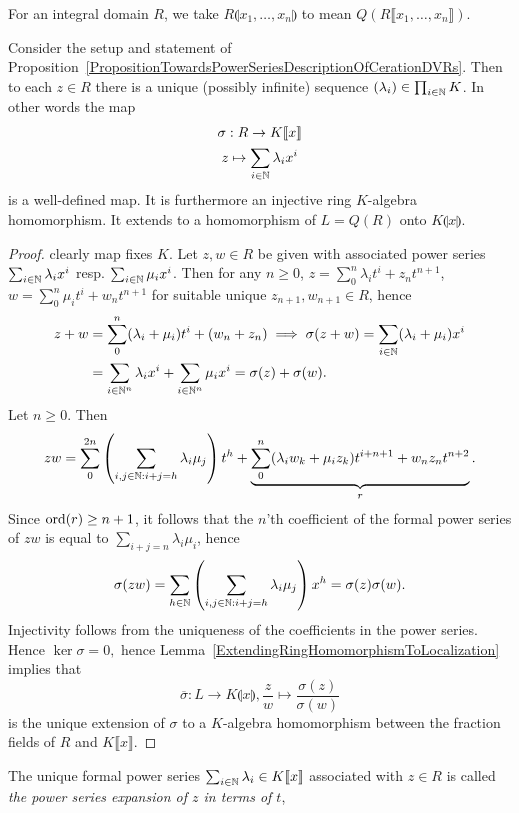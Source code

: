 \begin{definition}
    For an integral domain $R$, we take $R\llparenthesis x_1,\dots,x_n\rrparenthesis$ to mean $Q(R\llbracket x_1,\dots,x_n\rrbracket)$. 
\end{definition}
\begin{proposition}
    Consider the setup and statement of Proposition~\ref{PropositionTowardsPowerSeriesDescriptionOfCerationDVRs}. Then to each $z\in R$ there is a unique (possibly infinite) sequence $(\lambda_i)\in \prod_{i\in \mathbb{N}} K$. In other words the map 
    \begin{gather*}\sigma: R\rightarrow K\llbracket x\rrbracket\\
    z\mapsto \sum_{i\in\mathbb{N}} \lambda_ix^i\end{gather*}
    is a well-defined map.  It is furthermore an injective ring $K$-algebra homomorphism. It extends to a homomorphism of $L=Q(R)$ onto $K\llparenthesis x\rrparenthesis.$ 
\end{proposition}
\begin{proof}
    clearly map fixes $K$. Let $z,w\in R$ be given with associated power series $\sum_{i\in \mathbb{N}}\lambda_ix^i$ resp. $\sum_{i\in\mathbb{N}} \mu_ix^i$. 
    Then for any $n\geq 0$, $z=\sum_0^n \lambda_it^i + z_nt^{n+1}$, $w = \sum_0^n \mu_it^i+w_nt^{n+1}$ for suitable unique $z_{n+1},w_{n+1}\in R$, hence \begin{align*}z+w &= \sum_0^n (\lambda_i+\mu_i)t^i + (w_n+z_n)\implies \sigma(z+w) = \sum_{i\in\mathbb{N}} (\lambda_i+\mu_i)x^i\\ &= \sum_{i\in\mathbb{N}^n} \lambda_i x^i +\sum_{i\in\mathbb{N}^n} \mu_ix^i=\sigma(z)+\sigma(w).\end{align*} 
    Let $n\geq 0$. Then 
    $$zw = \sum_0^{2n} \left(\sum_{i,j\in \mathbb{N} : i+j=h} \lambda_i\mu_j\right)t^h + \underbrace{\sum_0^n (\lambda_iw_k+\mu_iz_k)t^{i+n+1} + w_nz_nt^{n+2}}_{r}.$$
    Since $\mathrm{ord}(r)\geq n+1$, it follows that the $n$'th coefficient of the formal power series of $zw$ is equal to $\sum_{i+j=n}\lambda_i\mu_i$, hence $$\sigma(zw)=\sum_{h\in\mathbb{N}} \left(\sum_{i,j\in\mathbb{N} : i+j=h}\lambda_i\mu_j\right)x^h = \sigma(z)\sigma(w).$$
    Injectivity follows from the uniqueness of the coefficients in the power series. Hence $\ker\sigma = 0,$ hence Lemma~\ref{ExtendingRingHomomorphismToLocalization} implies that $$\overline{\sigma} : L\rightarrow K\llparenthesis x\rrparenthesis, \frac{z}{w}\mapsto \frac{\sigma(z)}{\sigma(w)}$$
    is the unique extension of $\sigma$ to a $K$-algebra homomorphism between the fraction fields of $R$ and $K\llbracket x\rrbracket$.
\end{proof}
\begin{remark}
    The unique formal power series $\sum_{i\in \mathbb{N}} \lambda_i\in K\llbracket x\rrbracket$ associated with $z\in R$ is called \textit{the power series expansion of $z$ in terms of $t$}, 
\end{remark}

